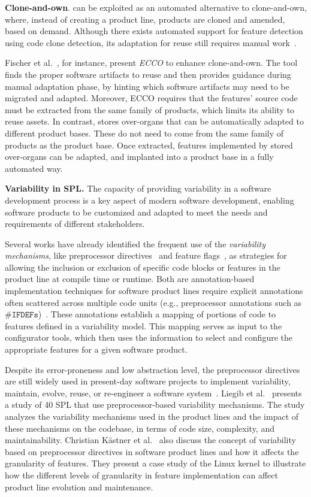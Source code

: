 \textbf{Clone-and-own}. \FOUNDRY can be exploited as an automated alternative to clone-and-own, where, instead of creating a product line, products are cloned and amended, based on demand.
Although there exists automated support for feature detection using code clone detection, its adaptation for reuse still requires manual work~\cite{Yoshimura2006, Kastner2014}. 

Fischer et al.~\cite{Fischer2015}, for instance, present \emph{ECCO} to enhance clone-and-own. 
The tool finds the proper software artifacts to reuse and then provides guidance during manual adaptation phase, by hinting which software artifacts may need to be migrated and adapted. 
Moreover, ECCO requires that the features' source code must be extracted from the same family of products, which limits its ability to reuse assets. 
In contrast, \FOUNDRY stores over-organs that can be automatically adapted to different product bases. These do not need to come from the same family of products as the product base. Once extracted, features implemented by stored over-organs can be adapted, and implanted into a product base in a fully automated way.

\textbf{Variability in SPL.} The capacity of providing variability in a software development process is a key aspect of modern software development, enabling software products to be customized and adapted to meet the needs and requirements of different stakeholders. 

Several works have already identified the frequent use of the \emph{variability mechanisms}, like preprocessor directives~\cite{Liebig2010} and feature flags~\cite{ Kruger2018, Meinicke2020}, as strategies for allowing the inclusion or exclusion of specific code blocks or features in the product line at compile time or runtime. Both are annotation-based implementation techniques for software product lines require explicit annotations often scattered across multiple code units (e.g., preprocessor annotations such as $\texttt{\#IFDEFs}$)~\cite{Apel2013}. 
These annotations establish a mapping of portions of code to features defined in a variability model. This mapping serves as input to the configurator tools, which then uses the information to select and configure the appropriate features for a given software product.

Despite its error-proneness and low abstraction level, the preprocessor directives are still widely used in present-day software projects to implement variability, maintain, evolve, reuse, or re-engineer a software system~\cite{Kruger2018}. Liegib et al.~\cite{Liebig2010} presents a study of 40 SPL that use preprocessor-based variability mechanisms. The study analyzes the variability mechanisms used in the product lines and the impact of these mechanisms on the codebase, in terms of code size, complexity, and maintainability. Christian Kästner et al.~\cite{Kastner2008} also discuss the concept of variability based on preprocessor directives in software product lines and how it affects the granularity of features. They present a case study of the Linux kernel to illustrate how the different levels of granularity in feature implementation can affect product line evolution and maintenance. 


